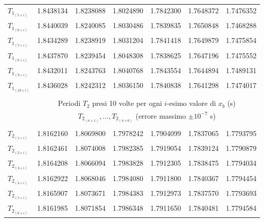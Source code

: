 \begin{table*}[t!]
\begin{tabular}{l*{6}{c}}
        $T_{1_{(5 \times i)}}$ & 1.8438134 & 1.8238088          & 1.8024890          & 1.7842300 & 1.7648372 & 1.7476352                  \\[+0.5ex]
        $T_{1_{(6 \times i)}}$ & 1.8440039 & 1.8240085          & 1.8030486          & 1.7839835 & 1.7650848 & 1.7468288                  \\[+0.5ex]
        $T_{1_{(7 \times i)}}$ & 1.8434289 & 1.8238919          & 1.8031204          & 1.7841418 & 1.7649879 & 1.7475854                  \\[+0.5ex]
        $T_{1_{(8 \times i)}}$ & 1.8437870 & 1.8239454          & 1.8048308          & 1.7838625 & 1.7647196 & 1.7475552                  \\[+0.5ex]
        $T_{1_{(9 \times i)}}$ & 1.8432011 & 1.8243763          & 1.8040768          & 1.7843554 & 1.7644894 & 1.7489131                  \\[+0.5ex]
        $T_{1_{(10\times i)}}$ & 1.8436028 & 1.8242312          & 1.8036150          & 1.7840838 & 1.7641298 & 1.7474017                  \\[+0.5ex] \hline \\[-1.5ex]
                               & \multicolumn{6}{c}{Periodi $T_2$ presi 10 volte per ogni $i$-esimo valore di $x_b$ (s)}                               \\[+0.5ex]
                               & \multicolumn{6}{c}{$T_{2_{(n \times 1)}}, \ldots, T_{2_{(n \times 6)}}$ (errore massimo $\pm10^{-7}$ s)} \\[+0.5ex] \hline \\[-1.5ex]
        $T_{2_{(1 \times i)}}$ & 1.8162160 & 1.8069800          & 1.7978242          & 1.7904099 & 1.7837065 & 1.7793795                  \\[+0.5ex]
        $T_{2_{(2 \times i)}}$ & 1.8162461 & 1.8074008          & 1.7982385          & 1.7919054 & 1.7839124 & 1.7790879                  \\[+0.5ex]
        $T_{2_{(3 \times i)}}$ & 1.8164208 & 1.8066094          & 1.7983828          & 1.7912305 & 1.7838475 & 1.7794034                  \\[+0.5ex]
        $T_{2_{(4 \times i)}}$ & 1.8162922 & 1.8068046          & 1.7984080          & 1.7911800 & 1.7840367 & 1.7794454                  \\[+0.5ex]
        $T_{2_{(5 \times i)}}$ & 1.8165907 & 1.8073671          & 1.7984383          & 1.7912973 & 1.7837570 & 1.7793693                  \\[+0.5ex]
        $T_{2_{(6 \times i)}}$ & 1.8161985 & 1.8071854          & 1.7986348          & 1.7911650 & 1.7840481 & 1.7794584                  \\[+0.5ex]

\end{tabular}
\end{table*}
